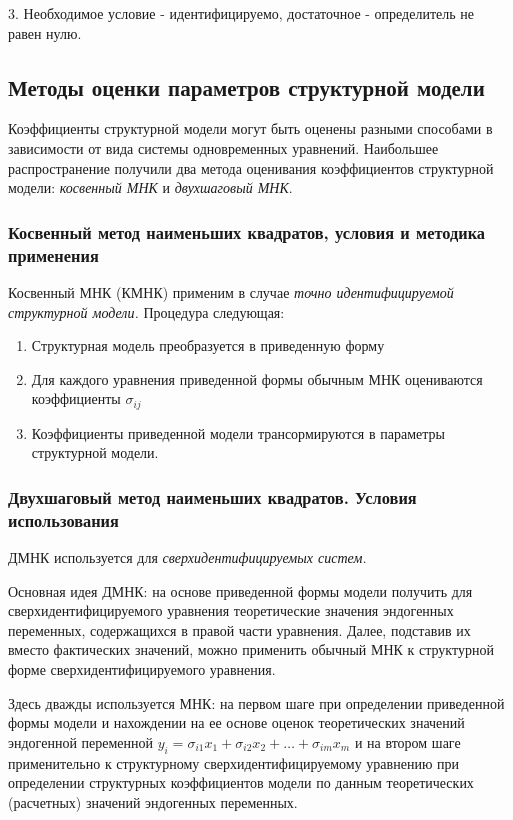 \documentclass[aps,%
12pt,%
final,%
oneside,
onecolumn,%
musixtex, %
superscriptaddress,%
centertags]{article} %
\theoremstyle{plain}
\theoremstyle{definition}
\theoremstyle{remark}
\begin{document}
3. Необходимое условие - идентифицируемо, достаточное - определитель не равен нулю.

\subsection{Методы оценки параметров структурной модели}

Коэффициенты структурной модели могут быть оценены разными способами в зависимости от вида системы одновременных
уравнений. Наибольшее распространение получили два метода оценивания коэффициентов структурной модели: \textit{косвенный МНК} и \textit{двухшаговый МНК}.

\subsubsection{Косвенный метод наименьших квадратов, условия и методика применения}

Косвенный МНК (КМНК) применим в случае \textit{точно идентифицируемой структурной модели.} Процедура следующая:

\begin{enumerate}
	\item Структурная модель преобразуется в приведенную форму
	\item Для каждого уравнения приведенной формы обычным МНК оцениваются коэффициенты $\sigma_{ij}$
	\item Коэффициенты приведенной модели трансормируются в параметры структурной модели.
\end{enumerate}

\subsubsection{Двухшаговый метод наименьших квадратов. Условия использования}

ДМНК используется для \textit{сверхидентифицируемых систем.} 

Основная идея ДМНК: на основе приведенной формы модели получить для сверхидентифицируемого уравнения теоретические значения эндогенных переменных, содержащихся в правой части уравнения. Далее, подставив их вместо фактических значений, можно применить обычный МНК к структурной форме сверхидентифицируемого уравнения. 

Здесь дважды используется МНК: на первом шаге при определении приведенной формы модели и нахождении на ее основе оценок теоретических значений эндогенной переменной $y_i = \sigma_{i1}x_1 + \sigma_{i2}x_2 + \ldots + \sigma_{im}x_m $ и на втором шаге применительно к структурному сверхидентифицируемому уравнению при определении
структурных коэффициентов модели по данным теоретических (расчетных) значений эндогенных переменных.
\end{document}
